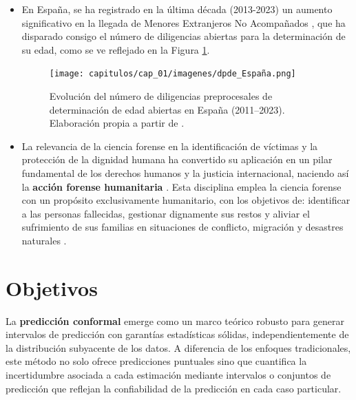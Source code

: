 \begin{itemize}
    \item En España, se ha registrado en la última década (2013-2023) un aumento significativo en la llegada de Menores Extranjeros No Acompañados \cite{fge2024,fge2019,fge2016,fge2013}, que ha disparado consigo el número de diligencias abiertas para la determinación de su edad, como se ve reflejado en la Figura \ref{fig:evolucion_DPDE}.

    \begin{figure}[htbp]
        \centering
        \texttt{[image: capitulos/cap\_01/imagenes/dpde\_España.png]}
        \caption{
            Evolución del número de diligencias preprocesales de determinación de edad abiertas en España (2011–2023). Elaboración propia a partir de \cite{fge2013,fge2016,fge2019, fge2024}.
        } 
        \label{fig:evolucion_DPDE}
    \end{figure}

    \item La relevancia de la ciencia forense en la identificación de víctimas y la protección de la dignidad humana ha convertido su aplicación en un pilar fundamental de los derechos humanos y la justicia internacional, naciendo así la  \textbf{acción forense humanitaria} \cite{cordner2017}. Esta disciplina emplea la ciencia forense con un propósito exclusivamente humanitario, con los objetivos de: identificar a las personas fallecidas, gestionar dignamente sus restos y aliviar el sufrimiento de sus familias en situaciones de conflicto, migración y desastres naturales \cite{tidballbinz2021}. 

\end{itemize}


\section{Objetivos}

La \textbf{predicción conformal} emerge como un marco teórico robusto para generar intervalos de predicción con garantías estadísticas sólidas, independientemente de la distribución subyacente de los datos. A diferencia de los enfoques tradicionales, este método no solo ofrece predicciones puntuales sino que cuantifica la incertidumbre asociada a cada estimación mediante intervalos o conjuntos de predicción que reflejan la confiabilidad de la predicción en cada caso particular.

